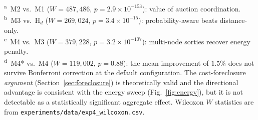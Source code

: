 \begin{doublespacing}
\begin{table}[ht]
\centering
\caption{Finder competitive ratio over 5{,}000 paired trials at the default
  setting ($n = 30$, $R = 3$, $E = 14$, $L = 10$).
  Mean, 95\% confidence interval, median, and standard deviation are
  reported.  The final column gives one-sided paired Wilcoxon signed-rank
  $p$-values for each model versus the comparison partner listed in the
  footnote; Bonferroni-corrected significance threshold is
  $\alpha/4 = 0.0125$.  \texttt{n.s.}~= not significant.
  FCR statistics are archived in
  \texttt{experiments/data/exp8\_stats.csv};
  Wilcoxon statistics are from \texttt{experiments/data/exp4\_wilcoxon.csv}.}
  \label{tab:main}
\vspace{2pt}
\vspace{4pt}

\noindent\footnotesize
\textsuperscript{a}~M2 vs.\ M1 ($W=487{,}486$, $p=2.9\times10^{-153}$): value of auction coordination.\\
\textsuperscript{b}~M3 vs.\ H$_d$ ($W=269{,}024$, $p=3.4\times10^{-15}$): probability-aware beats distance-only.\\
\textsuperscript{c}~M4 vs.\ M3 ($W=379{,}228$, $p=3.2\times10^{-107}$): multi-node sorties recover energy penalty.\\
\textsuperscript{d}~M4* vs.\ M4 ($W=119{,}002$, $p=0.88$): the mean improvement of $1.5\%$ does not
survive Bonferroni correction at the default configuration.  The
cost-foreclosure \emph{argument} (Section~\ref{sec:foreclosure}) is
theoretically valid and the directional advantage is consistent with
the energy sweep (Fig.~\ref{fig:energy}), but it is not
detectable as a statistically significant aggregate effect.
Wilcoxon $W$ statistics are from \texttt{experiments/data/exp4\_wilcoxon.csv}.
\end{table}


\end{doublespacing}
